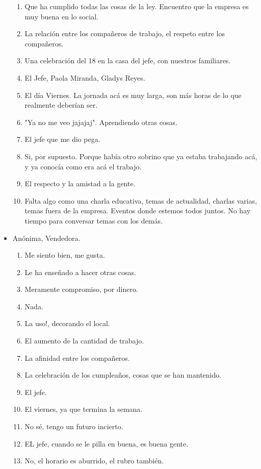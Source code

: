 \begin{itemize}
\begin{enumerate}
        \item Que ha cumplido todas las cosas de la ley. Encuentro que la
        empresa es muy buena en lo social.
        \item La relación entre los compañeros de trabajo, el respeto entre
        los compañeros.
        \item Una celebración del 18 en la casa del jefe, con nuestros
        familiares.
        \item El Jefe, Paola Miranda, Gladys Reyes.
        \item El día Viernes. La jornada acá es muy larga, son más horas de lo
        que realmente deberían ser.
        \item "Ya no me veo jajajaj". Aprendiendo otras cosas. 
        \item El jefe que me dio pega.
        \item Si, por supuesto. Porque había otro sobrino que ya estaba
        trabajando acá, y ya conocía como era acá el trabajo.
        \item El respecto y la amistad a la gente.
        \item Falta algo como una charla educativa, temas de actualidad,
        charlas varias, temas fuera de la empresa. Eventos donde estemos todos
        juntos. No hay tiempo para conversar temas con los demás.
    \end{enumerate}
    \item Anónima, Vendedora.
    \begin{enumerate}
		\item Me siento bien, me gusta.
		\item Le ha enseñado a hacer otras cosas.
		\item Meramente compromiso, por dinero.
		\item Nada.
		\item La uso!, decorando el local.
		\item El aumento de la cantidad de trabajo. 
		\item La afinidad entre los compañeros.
		\item La celebración de los cumpleaños, cosas que se han mantenido.
		\item El jefe.
		\item El viernes, ya que termina la semana.
		\item No sé, tengo un futuro incierto.
		\item EL jefe, cuando se le pilla en buena, es buena gente.
		\item No, el horario es aburrido, el rubro también.

\end{enumerate}
\end{itemize}
